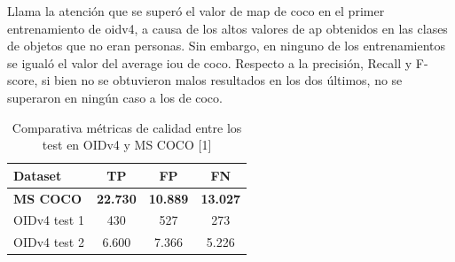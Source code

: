 Llama la atención que se superó el valor de \gls{map} de \gls{coco} en el primer entrenamiento de \gls{oidv4}, a causa de los altos valores de \gls{ap} obtenidos en las clases de objetos que no eran personas. Sin embargo, en ninguno de los entrenamientos se igualó el valor del average \gls{iou} de \gls{coco}. Respecto a la precisión, Recall y F-score, si bien no se obtuvieron malos resultados en los dos últimos, no se superaron en ningún caso a los de \gls{coco}.

\begin{table}[ht]
\centering
\caption{Comparativa métricas de calidad entre los test en OIDv4 y MS COCO [1]}
\label{tab:comparativa-metricas1}
\begin{tabular}{lccc}
\hline
\textbf{Dataset}                   & \textbf{TP}          & \textbf{FP}          & \textbf{FN}          \\ \hline
\textbf{MS COCO}                   & \textbf{22.730}      & \textbf{10.889}      & \textbf{13.027}      \\
OIDv4 test 1                       & 430                  & 527                  & 273                  \\
OIDv4 test 2                       & 6.600                & 7.366                & 5.226                \\ \hline
\end{tabular}
\end{table}

